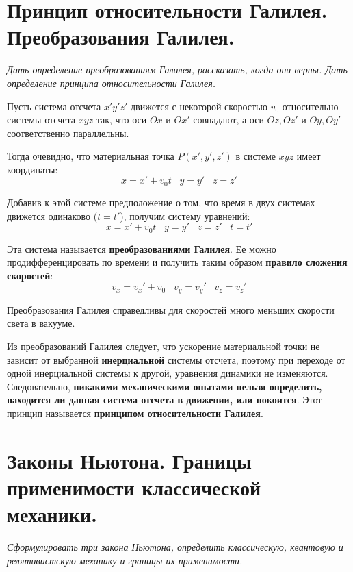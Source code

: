 \documentclass{article}
\begin{document}
  \section{Принцип относительности Галилея. Преобразования Галилея.}
    \par
      \textit{Дать определение преобразованиям Галилея, рассказать, когда они верны. Дать определение принципа относительности Галилея.}\\    
    \par
      Пусть система отсчета $x'y'z'$ движется с некоторой скоростью $v_0$ относительно системы отсчета $xyz$ так, что оси $Ox$ и $Ox'$ совпадают, а оси $Oz, Oz'$ и $Oy, Oy'$ соответственно параллельны.
    \par
      Тогда очевидно, что материальная точка $P(x',y',z')$ в системе $xyz$ имеет координаты:
      \begin{equation}
	x=x'+v_0t \;\;\; y=y' \;\;\; z=z'
      \end{equation}
    \par
      Добавив к этой системе предположение о том, что время в двух системах движется одинаково ($t=t'$), получим систему уравнений:
      \begin{equation}
	x=x'+v_0t \;\;\; y=y' \;\;\; z=z' \;\;\; t=t'
      \end{equation}
    \par
      Эта система называется \textbf{преобразованиями Галилея}. Ее можно продифференцировать по времени и получить таким образом \textbf{правило сложения скоростей}:
      \begin{equation}
	v_x=v_x'+v_0 \;\;\; v_y=v_y' \;\;\; v_z=v_z'
      \end{equation}      
    \par
      Преобразования Галилея справедливы для скоростей много меньших скорости света в вакууме.
    \par
      Из преобразований Галилея следует, что ускорение материальной точки не зависит от выбранной \textbf{инерциальной} системы отсчета, поэтому при переходе от одной инерциальной системы к другой, уравнения динамики не изменяются. Следовательно, \textbf{никакими механическими опытами нельзя определить, находится ли данная система отсчета в движении, или покоится}. Этот принцип называется \textbf{принципом относительности Галилея}.
  \clearpage
    
  \section{Законы Ньютона. Границы применимости классической механики.}
    \par
      \textit{Сформулировать три закона Ньютона, определить классическую, квантовую и релятивистскую механику и границы их применимости.}\\    
    \par    
\end{document}
